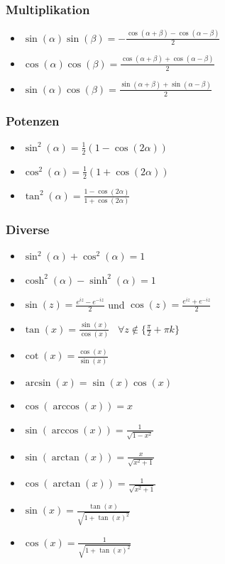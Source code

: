 \documentclass[8pt]{extarticle}
\begin{document}
\begin{multicols*}{3}
\subsubsection{Multiplikation}
\begin{itemize}
 \item $\sin(\alpha) \sin(\beta) = -\frac{\cos(\alpha + \beta) - \cos(\alpha - \beta)}{2}$
 \item $\cos(\alpha) \cos(\beta) =  \frac{\cos(\alpha + \beta) + \cos(\alpha - \beta)}{2}$
 \item $\sin(\alpha) \cos(\beta) =  \frac{\sin(\alpha + \beta) + \sin(\alpha - \beta)}{2}$
\end{itemize}

\subsubsection{Potenzen}
\begin{itemize}
 \item $\sin^2(\alpha) = \frac{1}{2}(1-\cos(2\alpha))$
 \item $\cos^2(\alpha) = \frac{1}{2}(1+\cos(2\alpha))$
 \item $\tan^2(\alpha) = \frac{1-\cos(2\alpha)}{1+\cos(2\alpha)}$
\end{itemize}

\subsubsection{Diverse}

\begin{itemize}
 \item $\sin^2(\alpha) + \cos^2(\alpha) = 1$
 \item $\cosh^2(\alpha) - \sinh^2(\alpha) = 1$
 \item $\sin(z) = \frac{e^{iz} - e^{-iz}}{2}$ und $\cos(z) = \frac{e^{iz} + e^{-iz}}{2}$
 \item $\tan(x) = \frac{\sin(x)}{\cos(x)} \;\;\; \forall z \not \in \{\frac{\pi}{2} + \pi k\}$
 \item $\cot(x) = \frac{\cos(x)}{\sin(x)}$
 \item $\arcsin(x) = \sin(x)\cos(x)$
 \item $\cos(\arccos(x)) = x$
 \item $\sin(\arccos(x)) = \frac{1}{\sqrt{1 - x^2}}$
 \item $\sin(\arctan(x)) = \frac{x}{\sqrt{x^2 + 1}}$
 \item $\cos(\arctan(x)) = \frac{1}{\sqrt{x^2 + 1}}$
 \item $\sin(x) = \frac{\tan(x)}{\sqrt{1 + \tan(x)^2}}$
 \item $\cos(x) = \frac{1}{\sqrt{1 + \tan(x)^2}}$


\end{itemize}
\end{multicols*}
\end{document}
